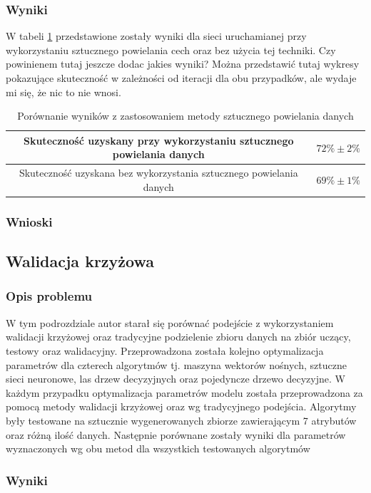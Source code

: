 \subsubsection{Wyniki}
W tabeli \ref{table:catdogs} przedstawione zostały wyniki dla sieci uruchamianej przy wykorzystaniu sztucznego powielania cech oraz bez użycia tej techniki. Czy powinienem tutaj jeszcze dodac jakies wyniki? Można przedstawić tutaj wykresy pokazujące skuteczność w zależności od iteracji dla obu przypadków, ale wydaje mi się, że nic to nie wnosi.

\begin{table}
\centering
\begin{tabular}{|c|c|}
\hline
Skuteczność uzyskany przy wykorzystaniu sztucznego powielania danych & $72\% \pm 2\%$ \\
\hline 
Skuteczność uzyskana bez wykorzystania sztucznego powielania danych & $69\% \pm 1\%$ \\
\hline 
 \end{tabular}
 \caption{Porównanie wyników z zastosowaniem metody sztucznego powielania danych} \label{table:catdogs}
\end{table}

\subsubsection{Wnioski}

\subsection{Walidacja krzyżowa}
\subsubsection{Opis problemu}
W tym podrozdziale autor starał się porównać podejście z wykorzystaniem walidacji krzyżowej oraz tradycyjne podzielenie zbioru danych na zbiór uczący, testowy oraz walidacyjny. Przeprowadzona została kolejno optymalizacja parametrów dla czterech algorytmów tj. maszyna wektorów nośnych, sztuczne sieci neuronowe, las drzew decyzyjnych oraz pojedyncze drzewo decyzyjne. W każdym przypadku optymalizacja parametrów modelu została przeprowadzona za pomocą metody walidacji krzyżowej oraz wg tradycyjnego podejścia.  Algorytmy były testowane na sztucznie wygenerowanych zbiorze zawierającym 7 atrybutów oraz różną ilość danych. Następnie porównane zostały wyniki dla parametrów wyznaczonych wg obu metod dla wszystkich testowanych algorytmów
\subsubsection{Wyniki}
